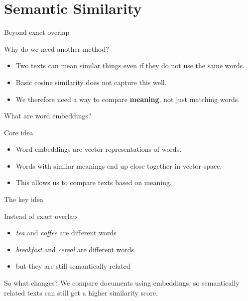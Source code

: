 \documentclass[compress]{beamer}
\begin{document}
\section{Semantic Similarity}

\begin{frame}{Beyond exact overlap}
  \begin{block}{Why do we need another method?}
    \begin{itemize}[<+>]
      \item Two texts can mean similar things even if they do not use the same words.
      \item Basic cosine similarity does not capture this well.
      \item We therefore need a way to compare \textbf{meaning}, not just matching words.
    \end{itemize}
  \end{block}
\end{frame}

\begin{frame}{What are word embeddings?}
  \begin{block}{Core idea}
    \begin{itemize}[<+>]
      \item Word embeddings are vector representations of words.
      \item Words with similar meanings end up close together in vector space.
      \item This allows us to compare texts based on meaning.
    \end{itemize}
  \end{block}
\end{frame}

\begin{frame}{The key idea}
  \begin{exampleblock}{Instead of exact overlap}
    \begin{itemize}[<+>]
      \item \textit{tea} and \textit{coffee} are different words
      \item \textit{breakfast} and \textit{cereal} are different words
      \item but they are still semantically related
    \end{itemize}
  \end{exampleblock}
  \pause
  \begin{alertblock}{So what changes?}
    We compare documents using embeddings, so semantically related texts can still get a higher similarity score.
  \end{alertblock}
\end{frame}
\end{document}
